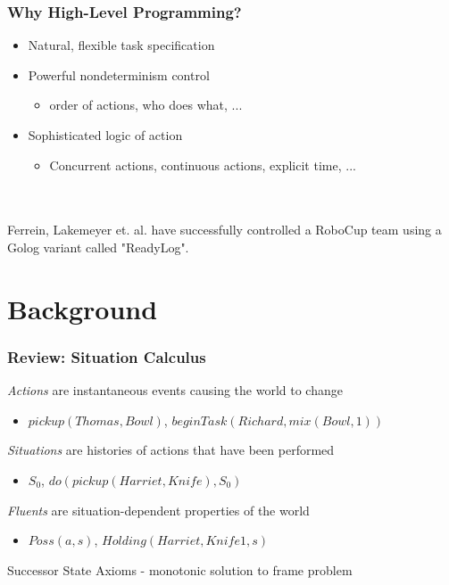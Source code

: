 \documentclass[compress]{beamer}
\begin{document}
\begin{frame}
\frametitle{Why High-Level Programming?}
\begin{itemize}
\item Natural, flexible task specification
\item Powerful nondeterminism control
  \begin{itemize}
  \item order of actions, who does what, ...
  \end{itemize}
\item Sophisticated logic of action
  \begin{itemize}
  \item Concurrent actions, continuous actions, explicit time, ...
  \end{itemize}
\end{itemize}
\ \\
\ \\
Ferrein, Lakemeyer et. al. have successfully controlled a RoboCup team using
a Golog variant called "ReadyLog".
\end{frame}


\section{Background}

\begin{frame}
\frametitle{Review: Situation Calculus}
\emph{Actions} are instantaneous events causing the world to change
\begin{itemize}
  \item $pickup(Thomas,Bowl)$, $beginTask(Richard,mix(Bowl,1))$
\end{itemize}
\emph{Situations} are histories of actions that have been performed
\begin{itemize}
  \item $S_0$, $do(pickup(Harriet,Knife),S_0)$
\end{itemize}
\emph{Fluents} are situation-dependent properties of the world
\begin{itemize}
  \item $Poss(a,s)$, $Holding(Harriet,Knife1,s)$
\end{itemize}
Successor State Axioms - monotonic solution to frame problem
\end{frame}
\end{document}
